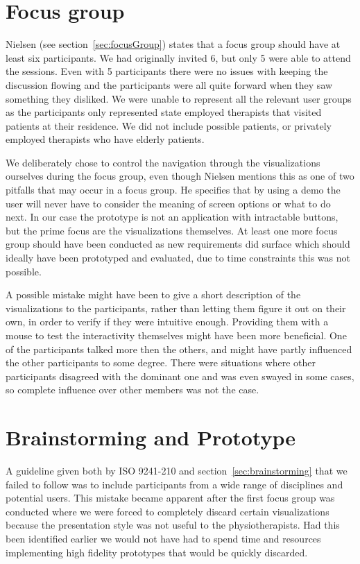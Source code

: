 \section{Focus group}
Nielsen (see section~\ref{sec:focusGroup}) states that a focus group should have at least six participants. We had originally invited 6, but only 5 were able to attend the sessions. Even with 5 participants there were no issues with keeping the discussion flowing and the participants were all quite forward when they saw something they disliked. We were unable to represent all the relevant user groups as the participants only represented state employed therapists that visited patients at their residence. We did not include possible patients, or privately employed therapists who have elderly patients.

We deliberately chose to control the navigation through the visualizations ourselves during the focus group, even though Nielsen mentions this as one of two pitfalls that may occur in a focus group. He specifies that by using a demo the user will never have to consider the meaning of screen options or what to do next. In our case the prototype is not an application with intractable buttons, but the prime focus are the visualizations themselves. At least one more focus group should have been conducted as new requirements did surface which should ideally have been prototyped and evaluated, due to time constraints this was not possible.

A possible mistake might have been to give a short description of the visualizations to the participants, rather than letting them figure it out on their own, in order to verify if they were intuitive enough. Providing them with a mouse to test the interactivity themselves might have been more beneficial. One of the participants talked more then the others, and might have partly influenced the other participants to some degree. There were situations where other participants disagreed with the dominant one and was even swayed in some cases, so complete influence over other members was not the case.

\section{Brainstorming and Prototype}
A guideline given both by ISO 9241-210 and section~\ref{sec:brainstorming} that we failed to follow was to include participants from a wide range of disciplines and potential users. This mistake became apparent after the first focus group was conducted where we were forced to completely discard certain visualizations because the presentation style was not useful to the physiotherapists. Had this been identified earlier we would not have had to spend time and resources implementing high fidelity prototypes that would be quickly discarded.

